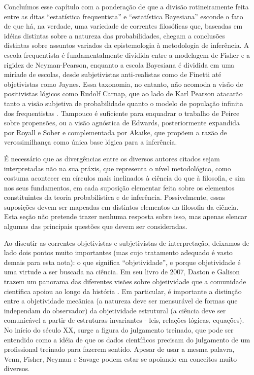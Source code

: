 Concluímos esse capítulo com a ponderação de que a divisão rotineiramente feita entre as ditas ``estatística
frequentista'' e 
``estatística Bayesiana'' esconde o fato de que há, na verdade, uma variedade de correntes filosóficas que, baseadas
em idéias distintas sobre a natureza das probabilidades, chegam a
conclusões distintas sobre assuntos variados da epistemologia 
à metodologia de inferência. A escola frequentista é fundamentalmente dividida entre a modelagem de Fisher e a
rigidez de
Neyman-Pearson, enquanto a escola Bayesiana é dividida em uma miríade de escolas, desde
subjetivistas anti-realistas como de Finetti até objetivistas como Jaynes.
Essa taxonomia, no entanto, não acomoda a visão de positivistas lógicos como Rudolf Carnap, que ao lado de Karl
Pearson atacarão tanto
a visão subjetiva de probabilidade quanto o modelo de população infinita dos frequentistas
\citep{Lenhard06, Zabell09}.
Tampouco é suficiente para enquadrar o trabalho de Peirce sobre propensões, ou a visão agnóstica de Edwards, 
posteriormente expandida por Royall e Sober e complementada por
Akaike, que propõem a razão de verossimilhança como única base lógica para a inferência.

É necessário que as divergências entre os diversos autores citados sejam interpretadas não na sua práxis, que
representa 
o nível metodológico, como costuma acontecer em círculos mais inclinados à ciência do que à filosofia, 
e sim nos seus fundamentos, em cada suposição elementar feita sobre os
elementos constituintes da teoria probabilística e de inferência. Possivelmente, essas suposições devem ser
mapeadas em
distintos elementos da filosofia da ciência. Esta seção não pretende trazer nenhuma resposta sobre isso,
mas apenas elencar algumas das principais questões que devem ser consideradas.

Ao discutir as correntes objetivistas e subjetivistas de interpretação, deixamos de lado dois pontos muito
importantes (mas cujo tratamento adequado é vasto demais para esta nota): o que significa ``objetividade'', e
porque objetividade é uma virtude a ser buscada na ciência. Em seu livro de 2007, Daston e Galison trazem
um panorama das diferentes visões sobre objetividade que a comunidade científica apoiou ao longo da história
\citep{Daston07}. Em particular, é importante a distinção entre a objetividade mecânica (a natureza deve 
ser mensurável de formas que independam do observador) da objetividade estrutural (a ciência deve ser
comunicável a partir de estruturas invariantes - leis, relações lógicas, equações). No início do século XX,
surge a figura do julgamento treinado, que pode ser entendido como a idéia de que os dados científicos
precisam do julgamento de um profissional treinado para fazerem sentido. Apesar de usar a mesma
palavra, Venn, Fisher, Neyman e Savage podem estar se apoiando em conceitos muito diversos.

